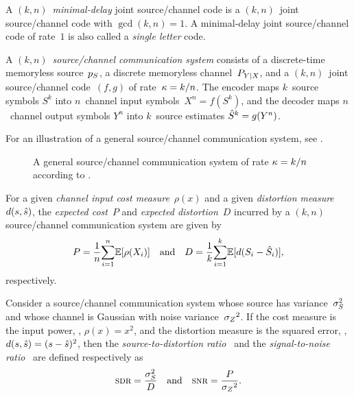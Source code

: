 \begin{definition}
  \label{def:mindelcode}
  A $(k,n)$~\emph{minimal-delay} joint source\slash channel code is a
  $(k,n)$~joint source/channel code with $\gcd(k,n) = 1$. A minimal-delay joint
  source/channel code of rate~$1$ is also called a \emph{single letter} code.
\end{definition}

\begin{definition}
  \label{def:jointsccommsys}
  A $(k,n)$~\emph{source/channel communication system} consists of
  a discrete-time memoryless source~${p_S}$, a discrete memoryless channel~$P_{Y|X}$,
  and a $(k,n)$~joint source/channel code~$(f,g)$ of rate~$\kappa = k/n$. The
  encoder maps $k$~source symbols $S^k$ into $n$~channel input symbols~$X^n =
  f(S^k)$, and the decoder maps $n$~channel output symbols $Y^n$ into $k$~source
  estimates ${\hat{S}}^k = g(Y^n)$.
\end{definition}

For an illustration of a general source/channel communication system, see
.
\begin{figure}[tbp]
  \begin{center}
  \end{center}
  \caption{A general source/channel communication system of rate $\kappa = k/n$
  according to .}
  \label{fig:gensccommsys}
\end{figure}

\begin{definition}
  \label{def:PDgen}
  For a given \emph{channel input cost measure}~$\rho(x)$ and a given
  \emph{distortion measure}~$d(s,{\hat{s}})$, the \emph{expected cost}~$P$ and
  \emph{expected distortion}~$D$ incurred by a $(k,n)$ source/channel
  communication system are given by
  \begin{equation*}
    P = \frac1n {\sum_{i=1}^n} \mathbb{E}[\rho(X_i)] \quad \text{and} \quad
    D = \frac1k {\sum_{i=1}^k} \mathbb{E}[d(S_i - {\hat{S}}_i)],
  \end{equation*}
  respectively.
\end{definition}

\begin{definition}
  \label{def:sdrsnr}
  Consider a source/channel communication system whose source has
  variance~${\sigma_S^2}$ and whose channel is Gaussian with noise variance~${{\sigma_Z}^2}$. If
  the cost measure is the input power, \ie, $\rho(x) = x^2$, and the distortion
  measure is the squared error, \ie, $d(s,{\hat{s}}) = (s - {\hat{s}})^2$, then the
  \emph{source-to-distortion ratio} \sdr\ and the \emph{signal-to-noise ratio}
  \snr\ are defined respectively as
  \begin{equation*}
    \sdr = \frac{\ssq}{D} \quad \text{and} \quad
    \snr = \frac{P}{\szq}.
  \end{equation*}
\end{definition}


